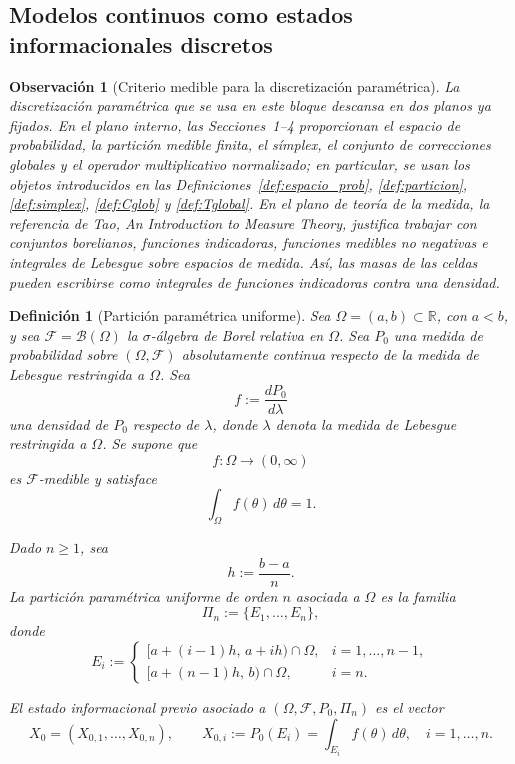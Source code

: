 \documentclass[12pt]{article}
\newtheorem{definicion}{Definición}[section]
\newtheorem{observacion}{Observación}[section]
\begin{document}
\subsection{Modelos continuos como estados informacionales discretos}

\begin{observacion}[Criterio medible para la discretización paramétrica]
La discretización paramétrica que se usa en este bloque descansa en dos planos ya fijados. En el plano interno, las Secciones~1--4 proporcionan el espacio de probabilidad, la partición medible finita, el símplex, el conjunto de correcciones globales y el operador multiplicativo normalizado; en particular, se usan los objetos introducidos en las Definiciones~\ref{def:espacio_prob}, \ref{def:particion}, \ref{def:simplex}, \ref{def:Cglob} y \ref{def:Tglobal}. En el plano de teoría de la medida, la referencia de Tao, \emph{An Introduction to Measure Theory}, justifica trabajar con conjuntos borelianos, funciones indicadoras, funciones medibles no negativas e integrales de Lebesgue sobre espacios de medida. Así, las masas de las celdas pueden escribirse como integrales de funciones indicadoras contra una densidad.
\end{observacion}

\begin{definicion}[Partición paramétrica uniforme]\label{def:particion_parametrica}
Sea $\Omega=(a,b)\subset\mathbb R$, con $a<b$, y sea $\mathcal F=\mathcal B(\Omega)$ la $\sigma$-álgebra de Borel relativa en $\Omega$. Sea $P_0$ una medida de probabilidad sobre $(\Omega,\mathcal F)$ absolutamente continua respecto de la medida de Lebesgue restringida a $\Omega$. Sea
\[
f:=\frac{dP_0}{d\lambda}
\]
una densidad de $P_0$ respecto de $\lambda$, donde $\lambda$ denota la medida de Lebesgue restringida a $\Omega$. Se supone que
\[
f:\Omega\to(0,\infty)
\]
es $\mathcal F$-medible y satisface
\[
\int_\Omega f(\theta)\,d\theta=1.
\]

Dado $n\ge 1$, sea
\[
h:=\frac{b-a}{n}.
\]
La \emph{partición paramétrica uniforme} de orden $n$ asociada a $\Omega$ es la familia
\[
\Pi_n:=\{E_1,\dots,E_n\},
\]
donde
\[
E_i:=
\begin{cases}
[a+(i-1)h,\,a+ih)\cap\Omega, & i=1,\dots,n-1,\\[4pt]
[a+(n-1)h,\,b)\cap\Omega, & i=n.
\end{cases}
\]

El \emph{estado informacional previo} asociado a $(\Omega,\mathcal F,P_0,\Pi_n)$ es el vector
\[
X_0=(X_{0,1},\dots,X_{0,n}),
\qquad
X_{0,i}:=P_0(E_i)=\int_{E_i} f(\theta)\,d\theta,
\quad i=1,\dots,n.
\]
\end{definicion}
\end{document}
